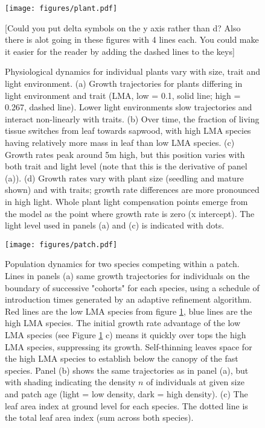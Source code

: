 \documentclass[a4paper,11pt]{article}
\begin{document}
\newpage

\begin{figure}[h!]
\centering
\texttt{[image: figures/plant.pdf]}
\caption{Physiological dynamics for individual plants vary with size, trait
and light environment. (a) Growth trajectories for plants differing in light
environment and trait (LMA, low = 0.1, solid line; high =  0.267, dashed
line). Lower light environments slow trajectories and interact non-linearly
with traits. (b) Over time, the fraction of living tissue switches from leaf
towards sapwood, with high LMA species having relatively more mass in leaf
than low LMA species. (c) Growth rates peak around 5m high, but this position
varies with both trait and light level (note that this is the derivative of
panel (a)). (d) Growth rates vary with plant size (seedling and mature shown)
and with traits; growth rate differences are more pronounced in high light.
Whole plant light compensation points emerge from the model as the point where
growth rate is zero (x intercept).  The light level used in panels (a) and (c)
is indicated with dots.} [Could you put delta symbols on the y axis rather than d? Also there is alot going in these figures with 4 lines each. You could make it easier for the reader by adding the dashed lines to the keys]
\label{fig:plant}
\end{figure}

\newpage

\begin{figure}[h!]
\centering
\texttt{[image: figures/patch.pdf]}
\caption{Population dynamics for two species competing within a patch. Lines
in panels (a) same growth trajectories for individuals on the
boundary of successive "cohorts" for each species, using a schedule of 
introduction times generated by an adaptive refinement algorithm.
 Red lines are the low LMA
species from figure \ref{fig:plant}, blue lines are the high LMA species.  The
initial growth rate advantage of the low LMA species (see Figure
\ref{fig:plant} c) means it quickly over tops the high LMA species,
suppressing its growth.  Self-thinning leaves space for the high LMA species
to establish below the canopy of the fast species. Panel (b) shows the same
trajectories as in panel (a), but with shading indicating the density $n$ of
individuals at given size and patch age (light = low density, dark = high density).  
(c) The leaf area index at ground
level for each species.  The dotted line is the total leaf area index (sum
across both species).}
\label{fig:patch}
\end{figure}
\end{document}
